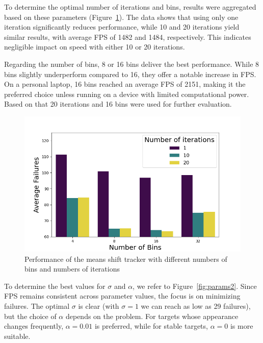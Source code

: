 \documentclass[9pt]{IEEEtran}
\begin{document}
To determine the optimal number of iterations and bins, results were aggregated based 
on these parameters (Figure~\ref{fig:params1}). The data shows that using only one
 iteration significantly reduces performance, while 10 and 20 iterations yield similar 
 results, with average FPS of 1482 and 1484, respectively. This indicates negligible impact
  on speed with either 10 or 20 iterations.

Regarding the number of bins, 8 or 16 bins deliver the best performance. While 8 bins 
slightly underperform compared to 16, they offer a notable increase in FPS. On a personal 
laptop, 16 bins reached an average FPS of 2151, making it the preferred choice unless
 running on a device with limited computational power. 
Based on that 20 iterations and 16 bins were used for further evaluation.

 \begin{figure}[h]
  \centering
  \includegraphics[width=0.8\columnwidth]{figures/nbins_niters.png}
  \caption{Performance of the means shift tracker with different numbers of bins and numbers of
  iterations}
  \label{fig:params1}
\end{figure}

To determine the best values for $\sigma$ and $\alpha$, we refer 
to Figure~\ref{fig:params2}. Since FPS remains consistent across parameter values,
 the focus is on minimizing failures. The optimal $\sigma$ is clear (with $\sigma = 1$ we can reach as low as 29 failures),
  but the choice 
 of $\alpha$ depends on the problem. For targets whose appearance changes frequently, $\alpha = 0.01$ 
 is preferred, while for stable targets, $\alpha = 0$ is more suitable.
\end{document}
